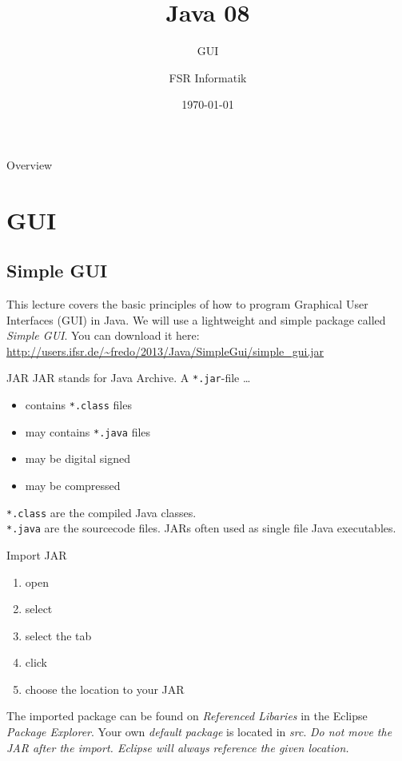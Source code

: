 

\title{Java 08}
\subtitle{GUI}
\author{FSR Informatik}
\date{\today}



\begin{frame}
\titlepage
\end{frame}

\begin{frame}{Overview}
\tableofcontents
\end{frame}

\section{GUI}
\subsection{Simple GUI}
\begin{frame}{}
	This lecture covers the basic principles of how to program Graphical User Interfaces (GUI) in Java.
	\vfill
	We will use a lightweight and simple package called \emph{Simple GUI}.
	You can download it here:\\
	\url{http://users.ifsr.de/~fredo/2013/Java/SimpleGui/simple_gui.jar}
\end{frame}

\begin{frame}{JAR}
	JAR stands for Java Archive. A \texttt{*.jar}-file \dots
	\begin{itemize}
		\item contains \texttt{*.class} files
		\item may contains \texttt{*.java} files
		\item may be digital signed
		\item may be compressed
	\end{itemize}
	\vfill
	\texttt{*.class} are the compiled Java classes.\\
	\texttt{*.java} are the sourcecode files.
	\vfill
	JARs often used as single file Java executables.
\end{frame}

\begin{frame}{Import JAR}
	\begin{enumerate}
		\item open 
		\item select 
		\item select the tab 
		\item click 
		\item choose the location to your JAR
	\end{enumerate}
	The imported package can be found on \emph{Referenced Libaries} in the Eclipse \emph{Package Explorer}.
	Your own \emph{default package} is located in \emph{src}.
	\vfill
	\emph{Do not move the JAR after the import. Eclipse will always reference the given location.}
\end{frame}

